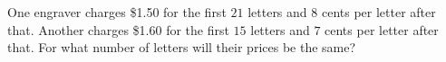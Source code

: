 One engraver charges \$1.50 for the first $21$ letters and $8$ cents per letter after that. Another charges \$1.60 for the first $15$ letters and $7$ cents per letter after that. For what number of letters will their prices be the same?
